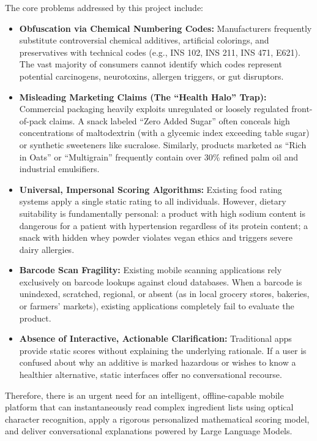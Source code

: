 \documentclass[12pt]{article}
\begin{document}
\noindent
The core problems addressed by this project include:

\begin{itemize}
    \item \textbf{Obfuscation via Chemical Numbering Codes:} Manufacturers frequently substitute controversial chemical additives, artificial colorings, and preservatives with technical codes (e.g., INS 102, INS 211, INS 471, E621). The vast majority of consumers cannot identify which codes represent potential carcinogens, neurotoxins, allergen triggers, or gut disruptors.
    \item \textbf{Misleading Marketing Claims (The ``Health Halo'' Trap):} Commercial packaging heavily exploits unregulated or loosely regulated front-of-pack claims. A snack labeled ``Zero Added Sugar'' often conceals high concentrations of maltodextrin (with a glycemic index exceeding table sugar) or synthetic sweeteners like sucralose. Similarly, products marketed as ``Rich in Oats'' or ``Multigrain'' frequently contain over 30\% refined palm oil and industrial emulsifiers.
    \item \textbf{Universal, Impersonal Scoring Algorithms:} Existing food rating systems apply a single static rating to all individuals. However, dietary suitability is fundamentally personal: a product with high sodium content is dangerous for a patient with hypertension regardless of its protein content; a snack with hidden whey powder violates vegan ethics and triggers severe dairy allergies.
    \item \textbf{Barcode Scan Fragility:} Existing mobile scanning applications rely exclusively on barcode lookups against cloud databases. When a barcode is unindexed, scratched, regional, or absent (as in local grocery stores, bakeries, or farmers' markets), existing applications completely fail to evaluate the product.
    \item \textbf{Absence of Interactive, Actionable Clarification:} Traditional apps provide static scores without explaining the underlying rationale. If a user is confused about why an additive is marked hazardous or wishes to know a healthier alternative, static interfaces offer no conversational recourse.
\end{itemize}

\vspace{0.3cm}

\noindent
Therefore, there is an urgent need for an intelligent, offline-capable mobile platform that can instantaneously read complex ingredient lists using optical character recognition, apply a rigorous personalized mathematical scoring model, and deliver conversational explanations powered by Large Language Models.
\end{document}
